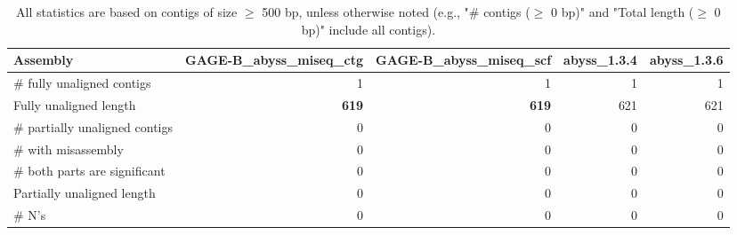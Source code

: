 \documentclass[12pt,a4paper]{article}
\begin{document}
\begin{table}[ht]
\begin{center}
\caption{All statistics are based on contigs of size $\geq$ 500 bp, unless otherwise noted (e.g., "\# contigs ($\geq$ 0 bp)" and "Total length ($\geq$ 0 bp)" include all contigs).}
\begin{tabular}{|l*{4}{|r}|}
\hline
Assembly & GAGE-B\_abyss\_miseq\_ctg & GAGE-B\_abyss\_miseq\_scf & abyss\_1.3.4 & abyss\_1.3.6 \\ \hline
\# fully unaligned contigs & 1 & 1 & 1 & 1 \\ \hline
Fully unaligned length & {\bf 619} & {\bf 619} & 621 & 621 \\ \hline
\# partially unaligned contigs & 0 & 0 & 0 & 0 \\ \hline
\hspace{5mm}\# with misassembly & 0 & 0 & 0 & 0 \\ \hline
\hspace{5mm}\# both parts are significant & 0 & 0 & 0 & 0 \\ \hline
Partially unaligned length & 0 & 0 & 0 & 0 \\ \hline
\# N's & 0 & 0 & 0 & 0 \\ \hline
\end{tabular}
\end{center}
\end{table}
\end{document}
